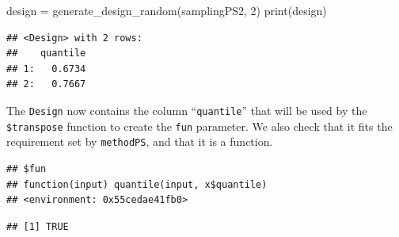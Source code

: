 \documentclass[
]{scrbook}
\newenvironment{Shaded}{\begin{snugshade}}{\end{snugshade}}
\newcommand{\DecValTok}[1]{\textcolor[rgb]{0.00,0.00,0.81}{#1}}
\newcommand{\FunctionTok}[1]{\textcolor[rgb]{0.00,0.00,0.00}{#1}}
\newcommand{\NormalTok}[1]{#1}
\newcommand{\OtherTok}[1]{\textcolor[rgb]{0.56,0.35,0.01}{#1}}
\newcommand{\SpecialCharTok}[1]{\textcolor[rgb]{0.00,0.00,0.00}{#1}}
\renewenvironment{Shaded} {\begin{snugshade}\small} {\end{snugshade}}
\begin{document}
\begin{Shaded}
\begin{Highlighting}[]
\NormalTok{design }\OtherTok{=} \FunctionTok{generate\_design\_random}\NormalTok{(samplingPS2, }\DecValTok{2}\NormalTok{)}
\FunctionTok{print}\NormalTok{(design)}
\end{Highlighting}
\end{Shaded}

\begin{verbatim}
## <Design> with 2 rows:
##    quantile
## 1:   0.6734
## 2:   0.7667
\end{verbatim}

The \texttt{Design} now contains the column ``\texttt{quantile}'' that will be used by the \texttt{\$transpose} function to create the \texttt{fun} parameter.
We also check that it fits the requirement set by \texttt{methodPS}, and that it is a function.

\begin{Shaded}
\end{Shaded}

\begin{verbatim}
## $fun
## function(input) quantile(input, x$quantile)
## <environment: 0x55cedae41fb0>
\end{verbatim}

\begin{Shaded}
\end{Shaded}

\begin{verbatim}
## [1] TRUE
\end{verbatim}

\begin{Shaded}
\end{Shaded}
\end{document}
